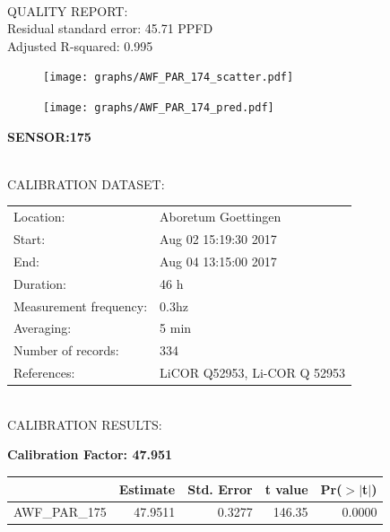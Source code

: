 \documentclass[oneside]{report}
\begin{document}
\hrulefill\\
QUALITY REPORT:\\
Residual standard error: 45.71 PPFD\\
Adjusted R-squared: 0.995



\begin{figure}[H]
  \centering
  \texttt{[image: graphs/AWF\_PAR\_174\_scatter.pdf]}
\end{figure}




\begin{figure}[H]
  \centering
  \texttt{[image: graphs/AWF\_PAR\_174\_pred.pdf]}
\end{figure}

\pagebreak


\begin{center}
\large{\textbf{SENSOR:175}}\\
\end{center}

\hrulefill\\
CALIBRATION DATASET:\\
\begin{table}[h!]
  \centering
  \label{tab:table1}
  \begin{tabular}{ll}
    Location: & Aboretum Goettingen\\ 
    
    
    Start:  & Aug 02 15:19:30 2017 \\
    End:   & Aug 04 13:15:00 2017\\ 
    Duration: & 46 h\\
    Measurement frequency: & 0.3hz\\
    Averaging:  &5 min\\
    Number of records: & 334 \\
    References: & LiCOR Q52953, Li-COR Q 52953 \\
  \end{tabular}
\end{table}

\hrulefill\\
CALIBRATION RESULTS:\\


\begin{center}
\textbf{\large{Calibration Factor: 47.951}}\\
\end{center}
\begin{table}[ht]
\centering
\begin{tabular}{rrrrr}
  \hline
 & Estimate & Std. Error & t value & Pr($>$$|$t$|$) \\ 
  \hline
AWF\_PAR\_175 & 47.9511 & 0.3277 & 146.35 & 0.0000 \\ 
   \hline
\end{tabular}
\end{table}
\end{document}
